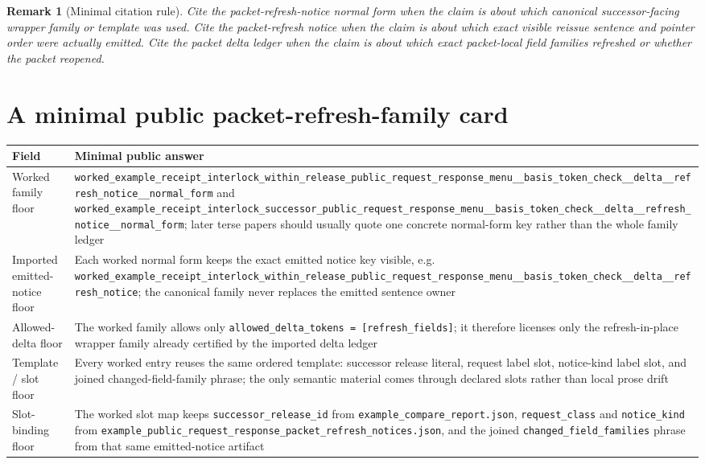 \documentclass[11pt]{article}
\newtheorem{remark}{Remark}
\begin{document}
\begin{remark}[Minimal citation rule]
Cite the packet-refresh-notice normal form when the claim is about \emph{which canonical successor-facing wrapper family or template was used}.
Cite the packet-refresh notice when the claim is about \emph{which exact visible reissue sentence and pointer order were actually emitted}.
Cite the packet delta ledger when the claim is about \emph{which exact packet-local field families refreshed or whether the packet reopened}.
\end{remark}

\section{A minimal public packet-refresh-family card}
\begin{table}[t]
\centering
\small
\begin{tabularx}{\linewidth}{@{}lX@{}}
\toprule
Field & Minimal public answer \\
\midrule
Worked family floor & \nolinkurl{worked_example_receipt_interlock_within_release_public_request_response_menu__basis_token_check__delta__refresh_notice__normal_form} and \nolinkurl{worked_example_receipt_interlock_successor_public_request_response_menu__basis_token_check__delta__refresh_notice__normal_form}; later terse papers should usually quote one concrete normal-form key rather than the whole family ledger \\
Imported emitted-notice floor & Each worked normal form keeps the exact emitted notice key visible, e.g. \nolinkurl{worked_example_receipt_interlock_within_release_public_request_response_menu__basis_token_check__delta__refresh_notice}; the canonical family never replaces the emitted sentence owner \\
Allowed-delta floor & The worked family allows only \nolinkurl{allowed_delta_tokens = [refresh_fields]}; it therefore licenses only the refresh-in-place wrapper family already certified by the imported delta ledger \\
Template / slot floor & Every worked entry reuses the same ordered template: successor release literal, request label slot, notice-kind label slot, and joined changed-field-family phrase; the only semantic material comes through declared slots rather than local prose drift \\
Slot-binding floor & The worked slot map keeps \nolinkurl{successor_release_id} from \nolinkurl{example_compare_report.json}, \nolinkurl{request_class} and \nolinkurl{notice_kind} from \nolinkurl{example_public_request_response_packet_refresh_notices.json}, and the joined \nolinkurl{changed_field_families} phrase from that same emitted-notice artifact \\

\end{tabularx}
\end{table}
\end{document}
